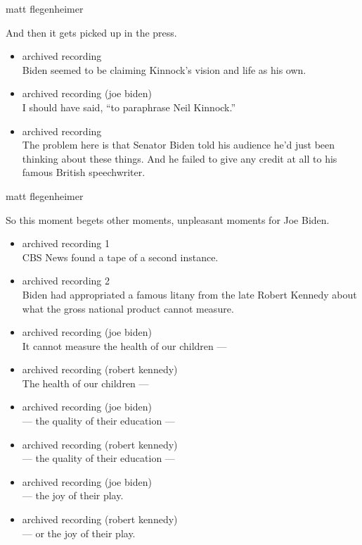 matt flegenheimer

And then it gets picked up in the press.

\begin{itemize}
\item
  archived recording\\
  Biden seemed to be claiming Kinnock's vision and life as his own.
\item
  archived recording (joe biden)\\
  I should have said, ``to paraphrase Neil Kinnock.''
\item
  archived recording\\
  The problem here is that Senator Biden told his audience he'd just
  been thinking about these things. And he failed to give any credit at
  all to his famous British speechwriter.
\end{itemize}

matt flegenheimer

So this moment begets other moments, unpleasant moments for Joe Biden.

\begin{itemize}
\item
  archived recording 1\\
  CBS News found a tape of a second instance.
\item
  archived recording 2\\
  Biden had appropriated a famous litany from the late Robert Kennedy
  about what the gross national product cannot measure.
\item
  archived recording (joe biden)\\
  It cannot measure the health of our children ---
\item
  archived recording (robert kennedy)\\
  The health of our children ---
\item
  archived recording (joe biden)\\
  --- the quality of their education ---
\item
  archived recording (robert kennedy)\\
  --- the quality of their education ---
\item
  archived recording (joe biden)\\
  --- the joy of their play.
\item
  archived recording (robert kennedy)\\
  --- or the joy of their play.
\end{itemize}

